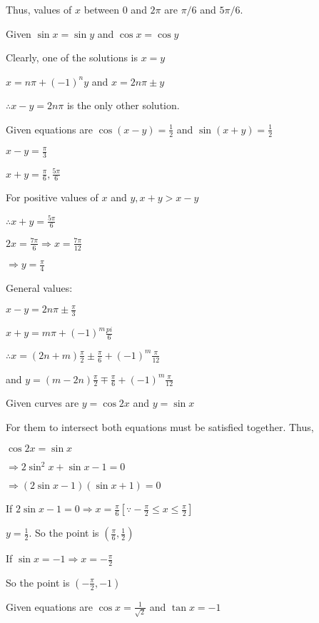   Thus, values of $x$ between $0$ and $2\pi$ are $\pi/6$ and $5\pi/6.$

\item Given $\sin x = \sin y$ and $\cos x = \cos y$

  Clearly, one of the solutions is $x = y$

  $x = n\pi + (-1)^ny$ and $x = 2n\pi\pm y$

  $\therefore x - y = 2n\pi$ is the only other solution.

\item Given equations are $\cos(x - y) = \frac{1}{2}$ and $\sin(x + y) = \frac{1}{2}$

  $x - y = \frac{\pi}{3}$

  $x + y = \frac{\pi}{6}, \frac{5\pi}{6}$

  For positive values of $x$ and $y, x + y > x - y$

  $\therefore x + y = \frac{5\pi}{6}$

  $2x = \frac{7\pi}{6}\Rightarrow x = \frac{7\pi}{12}$

  $\Rightarrow y = \frac{\pi}{4}$

  General values:

  $x - y = 2n\pi \pm \frac{\pi}{3}$

  $x + y = m\pi + (-1)^m\frac{pi}{6}$

  $\therefore x = (2n + m)\frac{\pi}{2}\pm\frac{\pi}{6} + (-1)^m\frac{\pi}{12}$

  and $y = (m - 2n)\frac{\pi}{2}\mp\frac{\pi}{6} + (-1)^m\frac{\pi}{12}$

\item Given curves are $y = \cos 2x$ and $y = \sin x$

  For them to intersect both equations must be satisfied together. Thus,

  $\cos2x = \sin x$

  $\Rightarrow 2\sin^2x + \sin x - 1 = 0$

  $\Rightarrow (2\sin x - 1)(\sin x + 1) = 0$

  If $2\sin x - 1 = 0 \Rightarrow x = \frac{\pi}{6} [\because -\frac{\pi}{2}\leq x\leq
    \frac{\pi}{2}]$

  $y = \frac{1}{2}.$ So the point is $\left(\frac{\pi}{6}, \frac{1}{2}\right)$

  If $\sin x = -1 \Rightarrow x = -\frac{\pi}{2}$

  So the point is $\left(-\frac{\pi}{2}, -1\right)$

\item Given equations are $\cos x = \frac{1}{\sqrt{2}}$ and $\tan x = -1$

